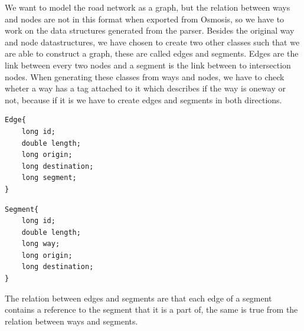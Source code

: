 We want to model the road network as a graph, but the relation between ways and nodes are not in this format when exported from Osmosis, so we have to work on the data structures generated from the parser.
Besides the original way and node datastructures, we have chosen to create two other classes such that we are able to construct a graph, these are called edges and segments.
Edges are the link between every two nodes and a segment is the link between to intersection nodes. When generating these classes from ways and nodes, we have to check wheter a way has a tag attached to it which describes if the way is oneway or not, because if it is we have to create edges and segments in both directions.

\begin{lstlisting}[style=java, caption=Datastructure for an edge]
Edge{
	long id;
	double length;
	long origin;
	long destination;
	long segment;
}
\end{lstlisting}

\begin{lstlisting}[style=java, caption=Datastructure for a segment]
Segment{
	long id;
	double length;
	long way;
	long origin;
	long destination;
}
\end{lstlisting}

The relation between edges and segments are that each edge of a segment contains a reference to the segment that it is a part of, the same is true from the relation between ways and segments.